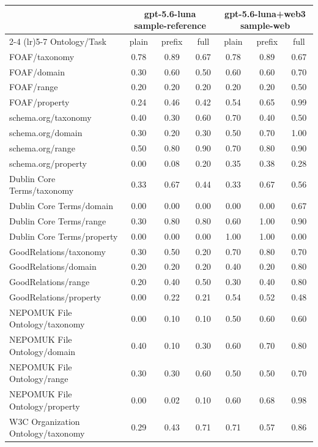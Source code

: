 \begin{tabular}{lcccccc}
\toprule
 & \multicolumn{3}{c}{gpt-5.6-luna sample-reference} & \multicolumn{3}{c}{gpt-5.6-luna+web3 sample-web} \\
\cmidrule(lr){2-4} \cmidrule(lr){5-7}
Ontology/Task & plain & prefix & full & plain & prefix & full \\
\midrule
FOAF/taxonomy & 0.78 & 0.89 & 0.67 & 0.78 & 0.89 & 0.67 \\
FOAF/domain & 0.30 & 0.60 & 0.50 & 0.60 & 0.60 & 0.70 \\
FOAF/range & 0.20 & 0.20 & 0.20 & 0.20 & 0.20 & 0.50 \\
FOAF/property & 0.24 & 0.46 & 0.42 & 0.54 & 0.65 & 0.99 \\
schema.org/taxonomy & 0.40 & 0.30 & 0.60 & 0.70 & 0.40 & 0.50 \\
schema.org/domain & 0.30 & 0.20 & 0.30 & 0.50 & 0.70 & 1.00 \\
schema.org/range & 0.50 & 0.80 & 0.90 & 0.70 & 0.80 & 0.90 \\
schema.org/property & 0.00 & 0.08 & 0.20 & 0.35 & 0.38 & 0.28 \\
Dublin Core Terms/taxonomy & 0.33 & 0.67 & 0.44 & 0.33 & 0.67 & 0.56 \\
Dublin Core Terms/domain & 0.00 & 0.00 & 0.00 & 0.00 & 0.00 & 0.67 \\
Dublin Core Terms/range & 0.30 & 0.80 & 0.80 & 0.60 & 1.00 & 0.90 \\
Dublin Core Terms/property & 0.00 & 0.00 & 0.00 & 1.00 & 1.00 & 0.00 \\
GoodRelations/taxonomy & 0.30 & 0.50 & 0.20 & 0.70 & 0.80 & 0.70 \\
GoodRelations/domain & 0.20 & 0.20 & 0.20 & 0.40 & 0.20 & 0.80 \\
GoodRelations/range & 0.20 & 0.40 & 0.50 & 0.30 & 0.40 & 0.80 \\
GoodRelations/property & 0.00 & 0.22 & 0.21 & 0.54 & 0.52 & 0.48 \\
NEPOMUK File Ontology/taxonomy & 0.00 & 0.10 & 0.10 & 0.50 & 0.60 & 0.60 \\
NEPOMUK File Ontology/domain & 0.40 & 0.10 & 0.30 & 0.60 & 0.70 & 0.80 \\
NEPOMUK File Ontology/range & 0.30 & 0.30 & 0.60 & 0.50 & 0.50 & 0.70 \\
NEPOMUK File Ontology/property & 0.00 & 0.02 & 0.10 & 0.60 & 0.68 & 0.98 \\
W3C Organization Ontology/taxonomy & 0.29 & 0.43 & 0.71 & 0.71 & 0.57 & 0.86 \\

\end{tabular}
